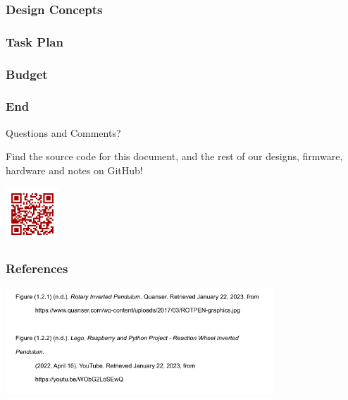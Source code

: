 \documentclass[aspectratio=169]{beamer}
\begin{document}
\begin{frame}
    \frametitle{Design Concepts}
\end{frame}

\begin{frame}
    \frametitle{Task Plan}
\end{frame}

\begin{frame}
    \frametitle{Budget}
\end{frame}

\begin{frame}
    \frametitle{End}

    \begin{block}{}
        \begin{center}
            \Huge Questions and Comments?
        \end{center}
    \end{block}

    \begin{center}
        Find the source code for this document, and the rest of our designs, firmware, hardware
        and notes on GitHub!

        \includegraphics[height=2cm]{github_qr}
    \end{center}

\end{frame}

\begin{frame}
    \frametitle{References}

    \includegraphics[height=4cm]{references}
\end{frame}
\end{document}
